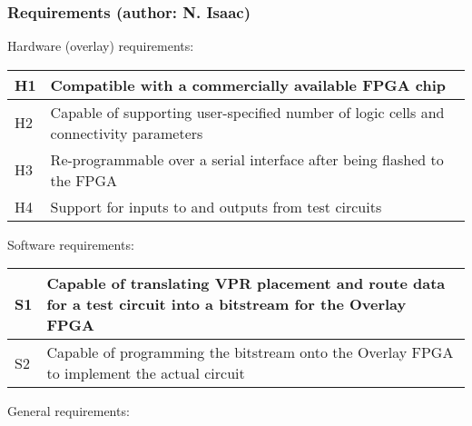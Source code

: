 \subsubsection{Requirements (author: N. Isaac)}

Hardware (overlay) requirements:

\begin{tabular}{|p{1cm}|p{15cm}|}
\hline
H1 & Compatible with a commercially available FPGA chip\\ \hline
H2 & Capable of supporting user-specified number of logic cells and connectivity parameters \\ \hline
H3 & Re-programmable over a serial interface after being flashed to the FPGA \\ \hline
H4 & Support for inputs to and outputs from test circuits \\ \hline
\end{tabular}


Software requirements:

\begin{tabular}{|p{1cm}|p{15cm}|}
\hline
S1 & Capable of translating VPR placement and route data for a test circuit into a bitstream for the Overlay FPGA\\ \hline
S2 & Capable of programming the bitstream onto the Overlay FPGA to implement the actual circuit \\ \hline
\end{tabular}



General requirements:

